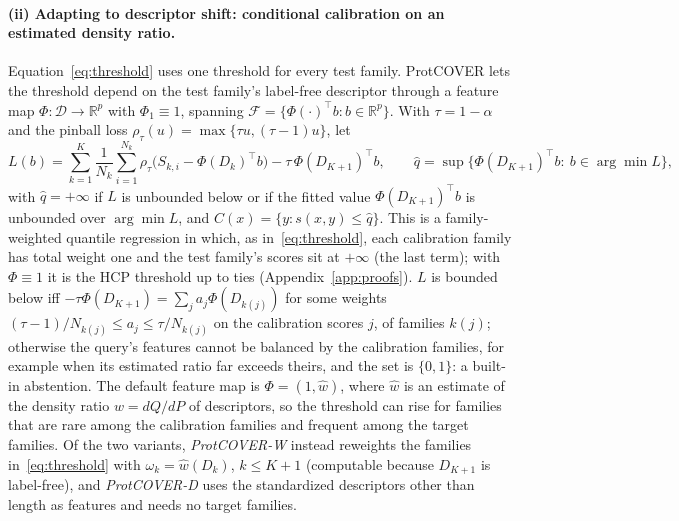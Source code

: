 \paragraph{(ii) Adapting to descriptor shift: conditional calibration on an estimated density ratio.}
Equation~\eqref{eq:threshold} uses one threshold for every test family. ProtCOVER lets the threshold depend on the test family's label-free descriptor through a feature map $\Phi:\mathcal{D}\to\mathbb{R}^p$ with $\Phi_1\equiv1$, spanning $\mathcal{F}=\{\Phi(\cdot)^\top b:b\in\mathbb{R}^p\}$. With $\tau=1-\alpha$ and the pinball loss $\rho_\tau(u)=\max\{\tau u,(\tau-1)u\}$, let
\begin{equation}\label{eq:condcal}
L(b)=\sum_{k=1}^{K}\frac{1}{N_k}\sum_{i=1}^{N_k}\rho_\tau\big(S_{k,i}-\Phi(D_k)^\top b\big)-\tau\,\Phi(D_{K+1})^\top b,\qquad
\hat q=\sup\{\Phi(D_{K+1})^\top b:\ b\in\arg\min L\},
\end{equation}
with $\hat q=+\infty$ if $L$ is unbounded below or if the fitted value $\Phi(D_{K+1})^\top b$ is unbounded over $\arg\min L$, and $C(x)=\{y:s(x,y)\le\hat q\}$. This is a family-weighted quantile regression in which, as in~\eqref{eq:threshold}, each calibration family has total weight one and the test family's scores sit at $+\infty$ (the last term); with $\Phi\equiv1$ it is the HCP threshold up to ties (Appendix~\ref{app:proofs}). $L$ is bounded below iff $-\tau\Phi(D_{K+1})=\sum_ja_j\Phi(D_{k(j)})$ for some weights $(\tau-1)/N_{k(j)}\le a_j\le\tau/N_{k(j)}$ on the calibration scores $j$, of families $k(j)$; otherwise the query's features cannot be balanced by the calibration families, for example when its estimated ratio far exceeds theirs, and the set is $\{0,1\}$: a built-in abstention. The default feature map is $\Phi=(1,\hat w)$, where $\hat w$ is an estimate of the density ratio $w=dQ/dP$ of descriptors, so the threshold can rise for families that are rare among the calibration families and frequent among the target families. Of the two variants, \emph{ProtCOVER-W} instead reweights the families in~\eqref{eq:threshold} with $\omega_k=\hat w(D_k)$, $k\le K+1$ (computable because $D_{K+1}$ is label-free), and \emph{ProtCOVER-D} uses the standardized descriptors other than length as features and needs no target families.

